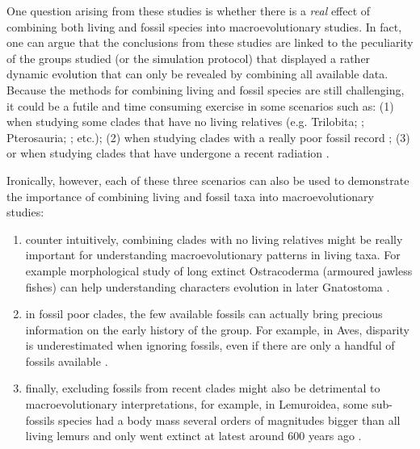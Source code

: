 One question arising from these studies is whether there is a \textit{real} effect of combining both living and fossil species into macroevolutionary studies.
In fact, one can argue that the conclusions from these studies are linked to the peculiarity of the groups studied (or the simulation protocol) that displayed a rather dynamic evolution that can only be revealed by combining all available data. %
Because the methods for combining living and fossil species are still challenging, it could be a futile and time consuming exercise in some scenarios such as: (1) when studying some clades that have no living relatives (e.g. Trilobita; \citealt{hopkinsdecoupling2013}; Pterosauria; \citealt{Butler2012}; etc.); (2) when studying clades with a really poor fossil record \citep[e.g. Aves where there are three orders of magnitude more known living than fossil taxa;][]{jetzthe2012,Mitchell2015}; (3) or when studying clades that have undergone a recent radiation \citep[e.g. Cichlidae][]{Genner01052007}. %

Ironically, %
however, each of these three scenarios can also be used to demonstrate the importance of combining living and fossil taxa into macroevolutionary studies:
\begin{enumerate}
\item counter intuitively, combining clades %
 with no living relatives might be really important for understanding macroevolutionary patterns in living taxa. For example morphological study of long extinct Ostracoderma (armoured jawless fishes) can help understanding characters evolution in later Gnatostoma \citep[jawed vertebrates;][]{Janvier2015}. %
\item in fossil poor clades, the few available fossils can actually bring precious information on the early history of the group. For example, in Aves, disparity is underestimated when ignoring fossils, even if there are only a handful of fossils available \citep[e.g. 58 fossil genera against 604 living ones;][]{Mitchell2015}.
\item finally, excluding fossils from recent clades might also be detrimental to macroevolutionary interpretations, for example, in Lemuroidea, some sub-fossils species had a body mass several orders of magnitudes bigger than all living lemurs \citep{hartwig2002primate,Jungers2008} and only went extinct at latest around 600 years ago \citep{goodman2003introduction}. %
\end{enumerate}

